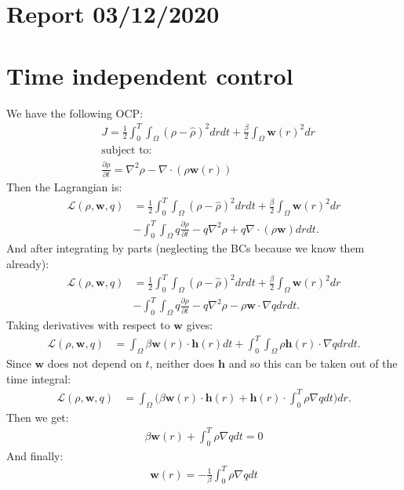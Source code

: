 \documentclass[11pt, a4paper]{article}
\theoremstyle{definition}
\newcommand{\w}{\mathbf{w}}
\newcommand{\h}{\mathbf{h}}
\begin{document}
	\section*{Report 03/12/2020}
	
	\section{Time independent control}
	We have the following OCP:
	\begin{align*}
		&J = \frac{1}{2}\int_0^T \int_\Omega (\rho - \widehat \rho)^2 dr dt + \frac{\beta}{2} \int_\Omega \w(r)^2 dr\\
		&\text{subject to:}\\
		&\frac{\partial \rho}{\partial t} = \nabla^2 \rho - \nabla \cdot (\rho \w(r))
	\end{align*}
	Then the Lagrangian is:
	\begin{align*}
		\mathcal{L}(\rho,\w, q) &=  \frac{1}{2}\int_0^T \int_\Omega (\rho - \widehat \rho)^2 dr dt + \frac{\beta}{2} \int_\Omega \w(r)^2 dr \\
		&- \int_0^T \int_\Omega q\frac{\partial \rho}{\partial t} - q\nabla^2 \rho + q\nabla \cdot (\rho \w) dr dt.
	\end{align*}
	And after integrating by parts (neglecting the BCs because we know them already):
	\begin{align*}
		\mathcal{L}(\rho,\w, q) &=  \frac{1}{2}\int_0^T \int_\Omega (\rho - \widehat \rho)^2 dr dt + \frac{\beta}{2} \int_\Omega \w(r)^2 dr \\
		&- \int_0^T \int_\Omega q\frac{\partial \rho}{\partial t} - q\nabla^2 \rho -  \rho \w \cdot \nabla q dr dt.
	\end{align*}
	Taking derivatives with respect to $\w$ gives:
	\begin{align*}
		\mathcal{L}(\rho,\w, q) &= \int_\Omega \beta \w(r) \cdot \h(r) dt + \int_0^T \int_\Omega \rho \h(r) \cdot \nabla q dr dt.
	\end{align*}
	Since $\w$ does not depend on $t$, neither does $\h$ and so this can be taken out of the time integral:
	\begin{align*}
		\mathcal{L}(\rho,\w, q) &= \int_\Omega \bigg( \beta \w(r) \cdot \h(r)  + \h(r) \cdot \int_0^T \rho  \nabla q dt \bigg) dr.
	\end{align*}
	Then we get:
	\begin{align*}
		\beta \w(r)  +  \int_0^T \rho  \nabla q dt = 0
	\end{align*}
	And finally:
	\begin{align*}
		\w(r) = - \frac{1}{\beta} \int_0^T \rho  \nabla q dt
	\end{align*}
	
\end{document}
